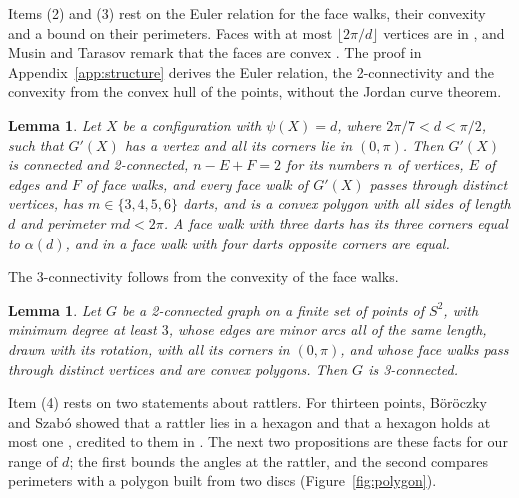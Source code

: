 \documentclass[12pt]{amsart}
\newtheorem{lemma}[theorem]{Lemma}
\theoremstyle{definition}
\theoremstyle{plain}
\theoremstyle{definition}
\newcommand{\Sph}{S^2}
\newcommand{\per}{\operatorname{per}}
\newcommand{\leanmap}[1]{\ignorespaces}
\newcommand{\mapnote}[1]{\ignorespaces}
\begin{document}
Items (2) and (3) rest on the Euler relation for the face walks, their convexity and a bound on their perimeters. Faces with at most $\lfloor2\pi/d\rfloor$ vertices are in \cite[Proposition~3.4]{MT13}, and Musin and Tarasov remark that the faces are convex \cite[Section~3.2]{MT13}. The proof in Appendix~\ref{app:structure} derives the Euler relation, the 2-connectivity and the convexity from the convex hull of the points, without the Jordan curve theorem.

\begin{lemma}\label{lem:faces}\leanmap{Tammes15.twoconn_contact, Tammes15.FaceChain.Setup.strictSupportFace, Tammes15.FaceChain.face_perimeter_lt, Tammes15.FaceChain.faceSizes_of, Tammes15.FaceChain.faceconvex_contact, Tammes15.equilateral_angle, Tammes15.rhombus_opposite_angle}\mapnote{with its faces in cone form, with $md<2\pi$ in place of $md=\per F$ and without the closure in an open hemisphere; the first sentence from the first four declarations; the fifth gives the convexity, the sizes and 3-connectivity (Lemma \ref{lem:threeconn}) under the hypotheses of Theorem \ref{thm:structure}; the last sentence is the last two, on a spherical triangle and a spherical rhombus with all sides $d$}
Let $X$ be a configuration with $\psi(X)=d$, where $2\pi/7<d<\pi/2$, such that $G'(X)$ has a vertex and all its corners lie in $(0,\pi)$. Then $G'(X)$ is connected and 2-connected, $n-E+F=2$ for its numbers $n$ of vertices, $E$ of edges and $F$ of face walks, and every face walk of $G'(X)$ passes through distinct vertices, has $m\in\{3,4,5,6\}$ darts, and is a convex polygon with all sides of length $d$ and perimeter $md<2\pi$. A face walk with three darts has its three corners equal to $\alpha(d)$, and in a face walk with four darts opposite corners are equal.
\end{lemma}

The 3-connectivity follows from the convexity of the face walks.

\begin{lemma}\label{lem:threeconn}\leanmap{Tammes15.FaceChain.threeconn}\mapnote{for faces in cone form}
Let $G$ be a 2-connected graph on a finite set of points of $\Sph$, with minimum degree at least $3$, whose edges are minor arcs all of the same length, drawn with its rotation, with all its corners in $(0,\pi)$, and whose face walks pass through distinct vertices and are convex polygons. Then $G$ is 3-connected.
\end{lemma}

Item (4) rests on two statements about rattlers. For thirteen points, B\"or\"oczky and Szab\'o showed that a rattler lies in a hexagon and that a hexagon holds at most one \cite[Lemmas~8 and~9(iii)]{BS13}, credited to them in \cite[Proposition~3.5]{MT13}. The next two propositions are these facts for our range of $d$; the first bounds the angles at the rattler, and the second compares perimeters with a polygon built from two discs (Figure~\ref{fig:polygon}).
\end{document}

